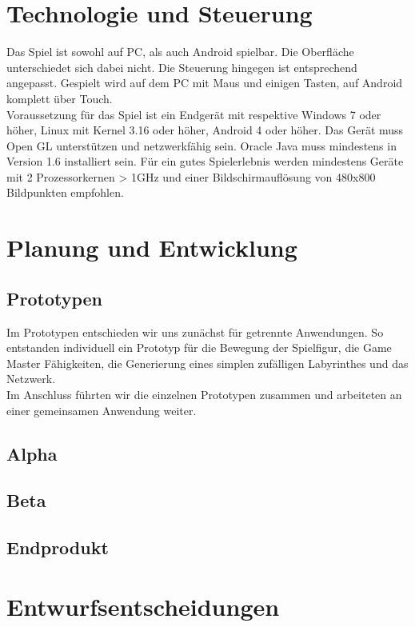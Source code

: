 \documentclass[10pt,a4paper,notitlepage]{scrreprt}
\begin{document}
\begin{flushleft}
\begin{center}
	\end{center}
\chapter{Technologie und Steuerung}
Das Spiel ist sowohl auf PC, als auch Android spielbar. Die Oberfläche unterschiedet sich dabei nicht. Die Steuerung hingegen ist entsprechend angepasst. Gespielt wird auf dem PC mit Maus und einigen Tasten, auf Android komplett über Touch.\\
Voraussetzung für das Spiel ist ein Endgerät mit respektive Windows 7 oder höher, Linux mit Kernel 3.16 oder höher, Android 4 oder höher. Das Gerät muss Open GL unterstützen und netzwerkfähig sein. Oracle Java muss mindestens in Version 1.6 installiert sein. Für ein gutes Spielerlebnis werden mindestens Geräte mit 2 Prozessorkernen > 1GHz und einer Bildschirmauflösung von 480x800 Bildpunkten empfohlen.

\chapter{Planung und Entwicklung}
\section{ Prototypen}
Im Prototypen entschieden wir uns zunächst für getrennte Anwendungen. So entstanden individuell ein Prototyp für die Bewegung der Spielfigur, die Game Master Fähigkeiten, die Generierung eines simplen zufälligen Labyrinthes und das Netzwerk.\\
Im Anschluss führten wir die einzelnen Prototypen zusammen und arbeiteten an einer gemeinsamen Anwendung weiter.

\section{Alpha}

\section{Beta}

\section{Endprodukt}

\chapter{Entwurfsentscheidungen}


\end{flushleft}
\end{document}
